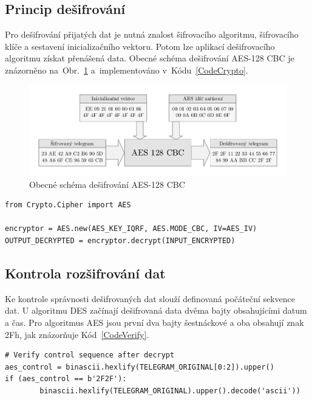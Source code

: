 \newpage{}

\subsection{Princip dešifrování}
Pro dešifrování přijatých dat je nutná znalost šifrovacího algoritmu, šifrovacího klíče a sestavení inicializačního vektoru. Potom lze aplikací dešifrovacího algoritmu získat přenášená data. Obecné schéma dešifrování AES-128 CBC je znázorněno na~Obr.~\ref{SchemaAESobecne} a~implementováno v~Kódu~\ref{CodeCrypto}.
\begin{figure}[!ht]
\vspace{-20pt}
 \begin{center}
    \includegraphics[scale=0.8]{obrazky/wmbus_aes_schema}
  \end{center}
	\vspace{-30pt}
  \caption{Obecné schéma dešifrování AES-128 CBC}
	\label{SchemaAESobecne}
	\vspace{-20pt}
\end{figure}

\begin{lstlisting}[caption={Implementace AES},captionpos=b,label=CodeCrypto,style=MyCodePython]
from Crypto.Cipher import AES

encryptor = AES.new(AES_KEY_IQRF, AES.MODE_CBC, IV=AES_IV)
OUTPUT_DECRYPTED = encryptor.decrypt(INPUT_ENCRYPTED)
\end{lstlisting}

\subsection{Kontrola rozšifrování dat}
Ke kontrole správnosti dešifrovaných dat slouží definovaná počáteční sekvence dat. U algoritmu DES začínají dešifrovaná data dvěma bajty obsahujícími datum a čas. Pro algoritmus AES jsou první dva bajty šestnáckové a oba obsahují znak 2Fh, jak znázorňuje Kód~\ref{CodeVerify}.

\begin{lstlisting}[caption={Ověření kontrolní sekvence AES},captionpos=b,label=CodeVerify,style=MyCodePython]
# Verify control sequence after decrypt
aes_control = binascii.hexlify(TELEGRAM_ORIGINAL[0:2]).upper()
if (aes_control == b'2F2F'):
		binascii.hexlify(TELEGRAM_ORIGINAL).upper().decode('ascii'))
\end{lstlisting}

